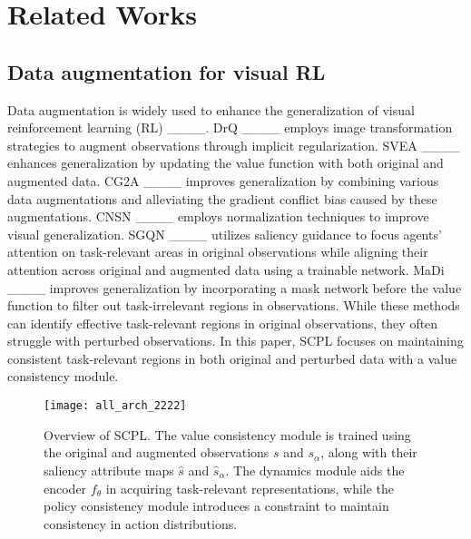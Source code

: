 \section{Related Works}
\label{sec2}
\subsection{Data augmentation for visual RL} 
Data augmentation is widely used to enhance the generalization of visual reinforcement learning (RL) ____. 
DrQ ____ employs image transformation strategies to augment observations through implicit regularization. 
SVEA ____ enhances generalization by updating the value function with both original and augmented data. 
CG2A ____ improves generalization by combining various data augmentations and alleviating the gradient conflict bias caused by these augmentations. 
CNSN ____ employs normalization techniques to improve visual generalization. 
SGQN ____ utilizes saliency guidance to focus agents' attention on task-relevant areas in original observations while aligning their attention across original and augmented data using a trainable network.
MaDi ____ improves generalization by incorporating a mask network before the value function to filter out task-irrelevant regions in observations.
While these methods can identify effective task-relevant regions in original observations, they often struggle with perturbed observations. In this paper, SCPL focuses on maintaining consistent task-relevant regions in both original and perturbed data with a value consistency module.

\begin{figure*}
  \centering
\texttt{[image: all\_arch\_2222]}
  \caption{Overview of SCPL. 
  The value consistency module is trained using the original and augmented observations \(s\) and \(s_{\alpha}\), along with their saliency attribute maps \(\hat{s}\) and \(\hat{s}_{\alpha}\). 
  The dynamics module aids the encoder \(f_{\theta}\) in acquiring task-relevant representations, while the policy consistency module introduces a constraint to maintain consistency in action distributions.} 
  \label{fig_all_arch}
  \vspace{-.2cm}
\end{figure*}

\vspace{-.2cm}
